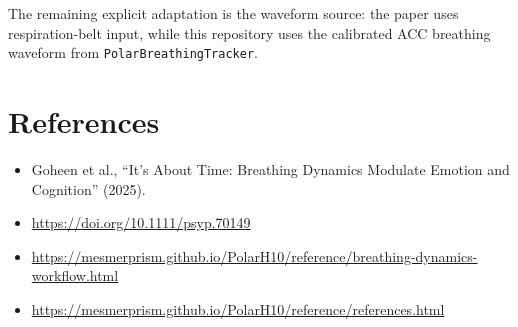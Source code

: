 \documentclass[11pt]{article}
\begin{document}
The remaining explicit adaptation is the waveform source: the paper uses
respiration-belt input, while this repository uses the calibrated ACC breathing
waveform from \texttt{PolarBreathingTracker}.

\section*{References}

\begin{itemize}[leftmargin=1.5em]
\item Goheen et al., ``It's About Time: Breathing Dynamics Modulate Emotion and Cognition'' (2025).
\item \url{https://doi.org/10.1111/psyp.70149}
\item \url{https://mesmerprism.github.io/PolarH10/reference/breathing-dynamics-workflow.html}
\item \url{https://mesmerprism.github.io/PolarH10/reference/references.html}
\end{itemize}
\end{document}
